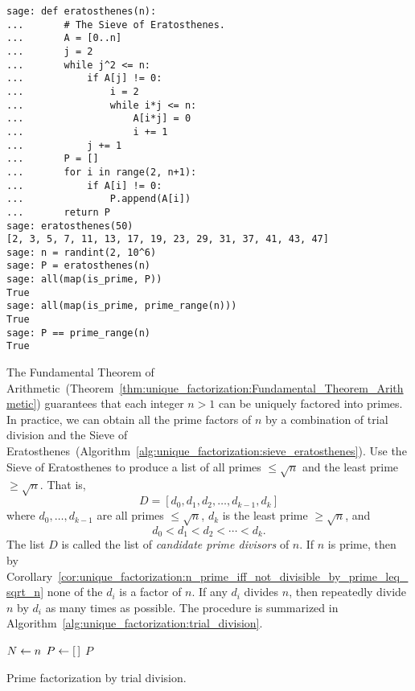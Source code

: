 \begin{lstlisting}
sage: def eratosthenes(n):
...       # The Sieve of Eratosthenes.
...       A = [0..n]
...       j = 2
...       while j^2 <= n:
...           if A[j] != 0:
...               i = 2
...               while i*j <= n:
...                   A[i*j] = 0
...                   i += 1
...           j += 1
...       P = []
...       for i in range(2, n+1):
...           if A[i] != 0:
...               P.append(A[i])
...       return P
sage: eratosthenes(50)
[2, 3, 5, 7, 11, 13, 17, 19, 23, 29, 31, 37, 41, 43, 47]
sage: n = randint(2, 10^6)
sage: P = eratosthenes(n)
sage: all(map(is_prime, P))
True
sage: all(map(is_prime, prime_range(n)))
True
sage: P == prime_range(n)
True
\end{lstlisting}

The Fundamental Theorem of
Arithmetic~(Theorem~\ref{thm:unique_factorization:Fundamental_Theorem_Arithmetic})
guarantees that each integer $n > 1$ can be uniquely factored into
primes. In practice, we can obtain all the prime factors of $n$ by a
combination of trial division and the Sieve of
Eratosthenes~(Algorithm~\ref{alg:unique_factorization:sieve_eratosthenes}). Use
the Sieve of Eratosthenes to produce a list of all primes
$\leq \sqrt{n}$ and the least prime $\geq \sqrt{n}$. That is,
\[
D
=
[d_0, d_1, d_2, \dots, d_{k-1}, d_k]
\]
where $d_0, \dots, d_{k-1}$ are all primes $\leq \sqrt{n}$, $d_k$ is
the least prime $\geq \sqrt{n}$, and
\[
d_0 < d_1 < d_2 < \cdots < d_k.
\]
The list $D$ is called the list of \emph{candidate prime divisors}
 of $n$. If $n$ is prime, then by
Corollary~\ref{cor:unique_factorization:n_prime_iff_not_divisible_by_prime_leq_sqrt_n}
none of the $d_i$ is a factor of $n$. If any $d_i$ divides $n$, then
repeatedly divide $n$ by $d_i$ as many times as possible. The
procedure is summarized in
Algorithm~\ref{alg:unique_factorization:trial_division}.
{\color{red}{This algorithm is wrong; rework it!}}

\begin{algorithm}[!htpb]
\dontprintsemicolon
\BlankLine
$N \leftarrow n$\;
$P \leftarrow [\,]$ \;
\Return $P$
\caption{Prime factorization by trial division.}
\label{alg:unique_factorization:trial_division}
\end{algorithm}
